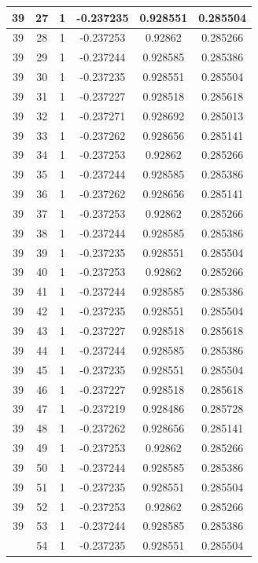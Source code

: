 \documentclass[12pt,a4paper]{article}
\numberwithin{equation}{section}
\numberwithin{figure}{section}
\numberwithin{table}{section}
\begin{document}
\begin{longtable}{|c|c|c|c|c|c|}
39 & 27 & 1 & -0.237235 & 0.928551 & 0.285504 \\ \hline
39 & 28 & 1 & -0.237253 & 0.92862 & 0.285266 \\ \hline
39 & 29 & 1 & -0.237244 & 0.928585 & 0.285386 \\ \hline
39 & 30 & 1 & -0.237235 & 0.928551 & 0.285504 \\ \hline
39 & 31 & 1 & -0.237227 & 0.928518 & 0.285618 \\ \hline
39 & 32 & 1 & -0.237271 & 0.928692 & 0.285013 \\ \hline
39 & 33 & 1 & -0.237262 & 0.928656 & 0.285141 \\ \hline
39 & 34 & 1 & -0.237253 & 0.92862 & 0.285266 \\ \hline
39 & 35 & 1 & -0.237244 & 0.928585 & 0.285386 \\ \hline
39 & 36 & 1 & -0.237262 & 0.928656 & 0.285141 \\ \hline
39 & 37 & 1 & -0.237253 & 0.92862 & 0.285266 \\ \hline
39 & 38 & 1 & -0.237244 & 0.928585 & 0.285386 \\ \hline
39 & 39 & 1 & -0.237235 & 0.928551 & 0.285504 \\ \hline
39 & 40 & 1 & -0.237253 & 0.92862 & 0.285266 \\ \hline
39 & 41 & 1 & -0.237244 & 0.928585 & 0.285386 \\ \hline
39 & 42 & 1 & -0.237235 & 0.928551 & 0.285504 \\ \hline
39 & 43 & 1 & -0.237227 & 0.928518 & 0.285618 \\ \hline
39 & 44 & 1 & -0.237244 & 0.928585 & 0.285386 \\ \hline
39 & 45 & 1 & -0.237235 & 0.928551 & 0.285504 \\ \hline
39 & 46 & 1 & -0.237227 & 0.928518 & 0.285618 \\ \hline
39 & 47 & 1 & -0.237219 & 0.928486 & 0.285728 \\ \hline
39 & 48 & 1 & -0.237262 & 0.928656 & 0.285141 \\ \hline
39 & 49 & 1 & -0.237253 & 0.92862 & 0.285266 \\ \hline
39 & 50 & 1 & -0.237244 & 0.928585 & 0.285386 \\ \hline
39 & 51 & 1 & -0.237235 & 0.928551 & 0.285504 \\ \hline
39 & 52 & 1 & -0.237253 & 0.92862 & 0.285266 \\ \hline
39 & 53 & 1 & -0.237244 & 0.928585 & 0.285386 \\ \hline
\pagebreak
39 & 54 & 1 & -0.237235 & 0.928551 & 0.285504 \\ \hline

\end{longtable}
\end{document}
